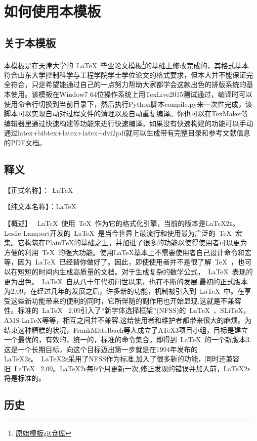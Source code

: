 \chapter{如何使用本模板}
\label{chap:howtouse}
\section{关于本模板}
本模板是在天津大学的~\LaTeX{}~毕业论文模板\footnote{\href{https://github.com/xnth97/TJUThesisLatexTemplate}{原始模板git仓库}}的基础上修改完成的，其格式基本符合山东大学控制科学与工程学院学士学位论文的格式要求，但本人并不能保证完全符合，只是希望能通过自己的一点努力帮助大家都学会这款出色的排版系统的基本使用。该模板在Window7 64位操作系统上用TexLive2015测试通过，编译时可以使用命令行切换到当前目录下，然后执行Python脚本compile.py来一次性完成，该脚本可以实现自动对过程文件的清理以及自动重复编译。你也可以在TexMaker等编辑器里通过快速构建等功能来进行快速编译。如果没有快速构建的功能可以手动通过latex+bibtex+latex+latex+dvi2pdf就可以生成带有完整目录和参考文献信息的PDF文档。
\section{释义}
【正式名称】：~\LaTeX{}~


【纯文本名称】：LaTeX


【概述】
~\LaTeX{}~使用~\TeX{}~作为它的格式化引擎，当前的版本是LaTeX2ε。Leslie Lamport开发的~\LaTeX{}~是当今世界上最流行和使用最为广泛的~\TeX{}~宏集。它构筑在PlainTeX的基础之上，并加进了很多的功能以使得使用者可以更为方便的利用~\TeX{}~的强大功能。使用LaTeX基本上不需要使用者自己设计命令和宏等，因为~\LaTeX{}~已经替你做好了。因此，即使使用者并不是很了解~\TeX{}~，也可以在短短的时间内生成高质量的文档。对于生成复杂的数学公式，~\LaTeX{}~表现的更为出色。~\LaTeX{}~自从八十年代初问世以来，也在不断的发展.最初的正式版本为2.09，在经过几年的发展之后，许多新的功能，机制被引入到~\LaTeX{}~中。在享受这些新功能带来的便利的同时，它所伴随的副作用也开始显现,这就是不兼容性。标准的~\LaTeX{}~ 2.09引入了“新字体选择框架”(NFSS)的~\LaTeX{}~、SLiTeX，AMS-LaTeX等等，相互之间并不兼容.这给使用者和维护者都带来很大的麻烦。为结束这种糟糕的状况，FrankMittelbach等人成立了ATeX3项目小组，目标是建立一个最优的，有效的，统一的，标准的命令集合。即得到~\LaTeX{}~的一个新版本3.这是一个长期目标，向这个目标迈出第一步就是在1994年发布的LaTeX2ε。~LaTeX2ε采用了NFSS作为标准,加入了很多新的功能，同时还兼容旧~\LaTeX{}~ 2.09。LaTeX2ε每6个月更新一次,修正发现的错误并加入前，LaTeX2ε将是标准的。
\section{历史}

